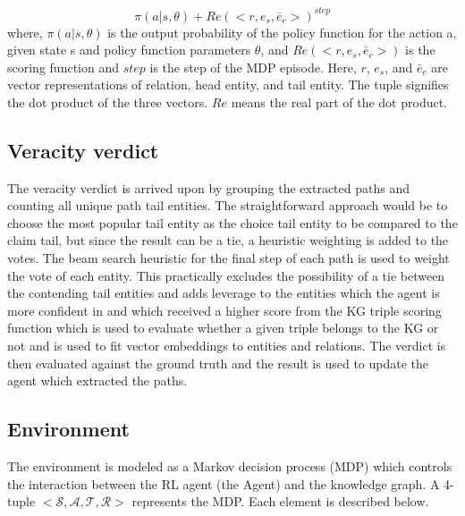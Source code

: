 \begin{equation}
\label{eq1}
\pi(a|s, \theta) + Re(< r, e_{s}, \bar{e}_c >)^{step}
\end{equation}
where, $\pi(a|s, \theta)$ is the output probability of the policy function for the action a, given state s and policy function parameters $\theta$, and $Re(< r, e_{s}, \bar{e}_c >)$ %
is the scoring function and $step$ is the step of the MDP episode. Here, $r$, $e_{s}$, and $\bar{e}_c$ are vector representations of relation, head entity, and tail entity. The tuple signifies the dot product of the three vectors. $Re$ means the real part of the dot product.


\subsection{Veracity verdict}\label{ver}
The veracity verdict is arrived upon by grouping the extracted paths and counting all unique path tail entities. The straightforward approach would be to choose the most popular tail entity as the choice tail entity to be compared to the claim tail, but since the result can be a tie, a heuristic weighting is added to the votes. The beam search heuristic for the final step of each path is used to weight the vote of each entity. This practically excludes the possibility of a tie between the contending tail entities and adds leverage to the entities which the agent is more confident in and which received a higher score from the KG triple scoring function which is used to evaluate whether a given triple belongs to the KG or not and is used to fit vector embeddings to entities and relations.
The verdict is then evaluated against the ground truth and the result is used to update the agent which extracted the paths.

\subsection{Environment}\label{env}

The environment is modeled as a Markov decision process (MDP) which controls the interaction between the RL agent (the Agent) and the knowledge graph. A 4-tuple $\mathcal{<S, A, T, R>}$ represents the MDP. Each element is described below.

